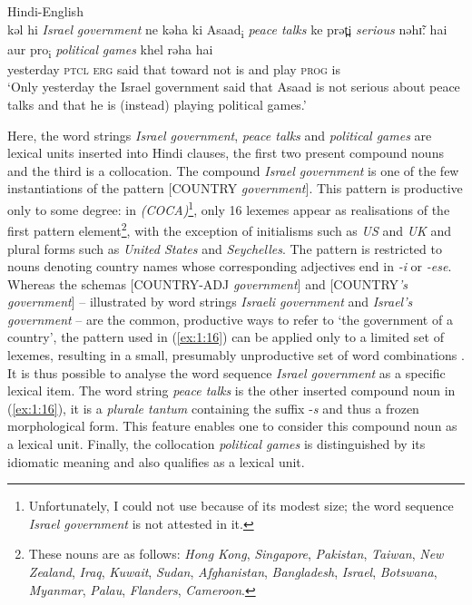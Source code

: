 \ea \label{ex:1:16}
Hindi-English \citep[228]{bhatt-1997}\\
\gll kəl hi \textit{Israel} \textit{government} ne kəha ki Asaad\textsubscript{i} \textit{peace talks} ke prət̪i \textit{serious} nəhɪ̃ː hai aur pro\textsubscript{i} \textit{political} \textit{games} khel rəha hai\\
yesterday \textsc{ptcl} {} {} \textsc{erg} said that {} {} {} toward {} not is and {} {} {} play \textsc{prog} is\\
\glt `Only yesterday the Israel government said that Asaad is not serious about peace talks and that he is (instead) playing political games.'
\z

\noindent Here, the word strings \textit{Israel government}, \textit{peace talks} and \textit{political games} are lexical units inserted into Hindi clauses, the first two present compound nouns and the third is a collocation. The compound \textit{Israel government} is one of the few instantiations of the pattern [COUNTRY \textit{government}]. This pattern is productive only to some degree: in  \textit{(COCA)}\footnote{
Unfortunately, I could not use  because of its modest size; the word sequence \textit{Israel government} is not attested in it.
}, only 16 lexemes appear as realisations of the first pattern element\footnote{These nouns are as follows: \textit{Hong Kong}, \textit{Singapore}, \textit{Pakistan}, \textit{Taiwan}, \textit{New Zealand}, \textit{Iraq}, \textit{Kuwait}, \textit{Sudan}, \textit{Afghanistan}, \textit{Bangladesh}, \textit{Israel}, \textit{Botswana}, \textit{Myanmar}, \textit{Palau}, \textit{Flanders}, \textit{Cameroon}.
}, with the exception of initialisms such as \textit{US} and \textit{UK} and plural forms such as \textit{United States} and \textit{Seychelles}. The pattern is restricted to nouns denoting country names whose corresponding adjectives end in \textit{-i} or \textit{-ese}. Whereas the schemas [\MakeUppercase{country-adj} \textit{government}] and [\MakeUppercase{country}\textit{'s government}] -- illustrated by word strings \textit{Israeli government} and \textit{Israel's government} -- are the common, productive ways to refer to `the government of a country', the pattern used in (\ref{ex:1:16}) can be applied only to a limited set of lexemes, resulting in a small, presumably unproductive set of word combinations \citep[cf.][74]{bauer01}. It is thus possible to analyse the word sequence \textit{Israel government} as a specific lexical item. The word string \textit{peace talks} is the other inserted compound noun in (\ref{ex:1:16}), it is a \textit{plurale tantum} containing the suffix -\textit{s} and thus a frozen morphological form. This feature enables one to consider this compound noun as a lexical unit. Finally, the collocation \textit{political games} is distinguished by its idiomatic meaning and also qualifies as a lexical unit.

